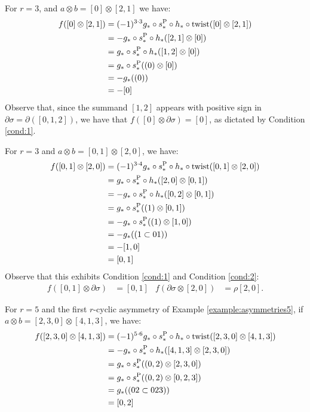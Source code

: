 \begin{example}\label{example:f3_1} For $r=3$, and $a\otimes b = [0]\otimes [2,1]$ we have:
	\begin{align*}
	f([0]\otimes [2,1]) &= (-1)^{3\cdot 3}g_*\circ s_*^{\operatorname{P}}\circ h_*\circ \operatorname{twist}([0]\otimes [2,1]) 
	\\
	&= -g_*\circ s_*^{\operatorname{P}}\circ h_*([2,1]\otimes [0])
	\\
	&= g_*\circ s_*^{\operatorname{P}}\circ h_*([1,2]\otimes [0])
	\\
	&= g_*\circ s_*^{\operatorname{P}}((0)\otimes [0])
	\\
	&= -g_*((0))
	\\
	&= -[0]
	\end{align*}
Observe that, since the summand $[1,2]$ appears with positive sign in $\partial \sigma = \partial([0,1,2])$, we have that $f([0]\otimes \partial\sigma) = [0]$, as dictated by Condition \eqref{cond:1}. 
\end{example}
\begin{example}\label{example:f3_2}
For $r=3$ and $a\otimes b = [0,1]\otimes [2,0]$, we have:
\begin{align*}
	f([0,1]\otimes [2,0]) &= (-1)^{3\cdot 4}g_*\circ s_*^{\operatorname{P}}\circ h_*\circ \operatorname{twist}([0,1]\otimes [2,0]) 
	\\
	&= g_*\circ s_*^{\operatorname{P}}\circ h_*([2,0]\otimes [0,1])
	\\
	&= -g_*\circ s_*^{\operatorname{P}}\circ h_*([0,2]\otimes [0,1])
	\\
	&= g_*\circ s_*^{\operatorname{P}}((1)\otimes [0,1])
	\\
	&= -g_*\circ s_*^{\operatorname{P}}((1)\otimes [1,0])
	\\
	&= -g_*((1\subset 01))
	\\
	&= -[1,0]
	\\
	&= [0,1]
	\end{align*}
Observe that this exhibits Condition \eqref{cond:1} and Condition \eqref{cond:2}: 
\begin{align*}
f([0,1]\otimes \partial\sigma) &= [0,1]
&
f(\partial\sigma \otimes [2,0]) &= \rho[2,0].
\end{align*}
\end{example}
\begin{example}\label{example:f5_1}
For $r=5$ and the first $r$-cyclic asymmetry of Example \ref{example:asymmetries5}, if $a\otimes b = [2,3,0]\otimes [4,1,3]$, we have:
\begin{align*}
	f([2,3,0]\otimes [4,1,3]) &= (-1)^{5\cdot 6}g_*\circ s_*^{\operatorname{P}}\circ h_*\circ \operatorname{twist}([2,3,0]\otimes [4,1,3]) 
	\\
	&= -g_*\circ s_*^{\operatorname{P}}\circ h_*([4,1,3]\otimes [2,3,0])
	\\
	&= g_*\circ s_*^{\operatorname{P}}((0,2)\otimes [2,3,0])
	\\
	&= g_*\circ s_*^{\operatorname{P}}((0,2)\otimes [0,2,3])
	\\
	&= g_*((02\subset 023))
	\\
	&= [0,2]	
	\end{align*}
\end{example}
